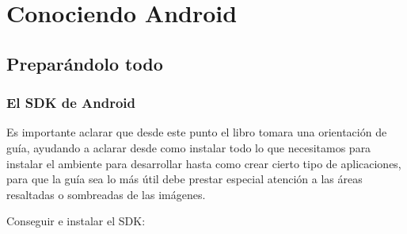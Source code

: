 \documentclass[11pt]{book}
\begin{document}







\part{Conociendo Android}    
            
\chapter{Preparándolo todo}              
\newpage
\section{El SDK de Android}
Es importante aclarar que desde este punto el libro tomara una orientación de guía, ayudando a aclarar desde como instalar todo lo que necesitamos para instalar el ambiente para desarrollar hasta como crear cierto tipo de aplicaciones, para que la guía sea lo más útil debe prestar especial atención a las áreas resaltadas o sombreadas de las imágenes. 

Conseguir e instalar el SDK:
\end{document}
